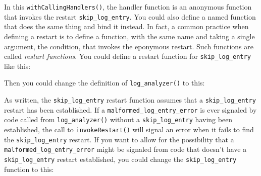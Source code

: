 \begin{Shaded}
\begin{Highlighting}[]
\StringTok{ }
  \StringTok{ }\NormalTok{()}
  
  \NormalTok{(}
     \NormalTok{(}\NormalTok{),}
  \NormalTok{)}
\NormalTok{\}}
\end{Highlighting}
\end{Shaded}

In this \texttt{withCallingHandlers()}, the handler function is an
anonymous function that invokes the restart \texttt{skip\_log\_entry}.
You could also define a named function that does the same thing and bind
it instead. In fact, a common practice when defining a restart is to
define a function, with the same name and taking a single argument, the
condition, that invokes the eponymous restart. Such functions are called
\emph{restart functions}. You could define a restart function for
\texttt{skip\_log\_entry} like this:

\begin{Shaded}
\begin{Highlighting}[]
\StringTok{ }\NormalTok{(}\NormalTok{)}
\end{Highlighting}
\end{Shaded}

Then you could change the definition of \texttt{log\_analyzer()} to
this:

\begin{Shaded}
\begin{Highlighting}[]
\StringTok{ }
  \StringTok{ }\NormalTok{()}
  
  \NormalTok{(}
     
  \NormalTok{)}
\NormalTok{\}}
\end{Highlighting}
\end{Shaded}

As written, the \texttt{skip\_log\_entry} restart function assumes that
a \texttt{skip\_log\_entry} restart has been established. If a
\texttt{malformed\_log\_entry\_error} is ever signaled by code called
from \texttt{log\_analyzer()} without a \texttt{skip\_log\_entry} having
been established, the call to \texttt{invokeRestart()} will signal an
error when it fails to find the \texttt{skip\_log\_entry} restart. If
you want to allow for the possibility that a
\texttt{malformed\_log\_entry\_error} might be signaled from code that
doesn't have a \texttt{skip\_log\_entry} restart established, you could
change the \texttt{skip\_log\_entry} function to this:

